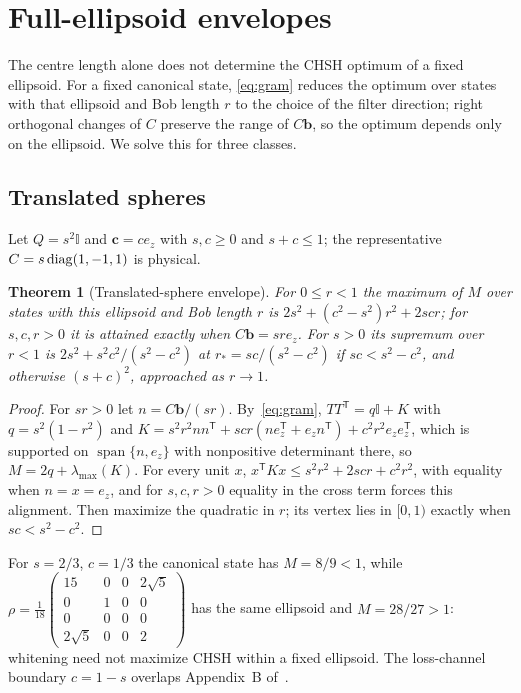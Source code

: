 \documentclass[11pt]{article}
\newtheorem{theorem}{Theorem}[section]
\theoremstyle{remark}\newtheorem{remark}[theorem]{Remark}
\newcommand{\id}{\mathbb I}\newcommand{\ket}[1]{|#1\rangle}
\newcommand{\cv}{\bm c}\newcommand{\av}{\bm a}\newcommand{\bv}{\bm b}
\begin{document}
\section{Full-ellipsoid envelopes}\label{sec:shapes}

The centre length alone does not determine the CHSH optimum of a fixed
ellipsoid. For a fixed canonical state, \eqref{eq:gram} reduces the optimum
over states with that ellipsoid and Bob length $r$ to the choice of the filter
direction; right orthogonal changes of $C$ preserve the range of $C\bv$, so the
optimum depends only on the ellipsoid. We solve this for three classes.

\subsection{Translated spheres}
Let $Q=s^2\id$ and $\cv=ce_z$ with $s,c\ge0$ and $s+c\le1$; the representative
$C=s\operatorname{diag}(1,-1,1)$ is physical.

\begin{theorem}[Translated-sphere envelope]\label{thm:sphere}
For $0\le r<1$ the maximum of $M$ over states with this ellipsoid and Bob
length $r$ is $2s^2+(c^2-s^2)r^2+2scr$; for $s,c,r>0$ it is attained exactly
when $C\bv=sre_z$. For $s>0$ its supremum over $r<1$ is
$2s^2+s^2c^2/(s^2-c^2)$ at $r_*=sc/(s^2-c^2)$ if $sc<s^2-c^2$, and otherwise
$(s+c)^2$, approached as $r\to1$.
\end{theorem}
\begin{proof}
For $sr>0$ let $n=C\bv/(sr)$. By~\eqref{eq:gram},
$TT^{\mathsf T}=q\id+K$ with $q=s^2(1-r^2)$ and
$K=s^2r^2nn^{\mathsf T}+scr(ne_z^{\mathsf T}+e_zn^{\mathsf T})+c^2r^2e_ze_z^{\mathsf T}$,
which is supported on $\operatorname{span}\{n,e_z\}$ with nonpositive
determinant there, so $M=2q+\lambda_{\max}(K)$. For every unit $x$,
$x^{\mathsf T}Kx\le s^2r^2+2scr+c^2r^2$, with equality when $n=x=e_z$, and
for $s,c,r>0$ equality in the cross term forces this alignment. Then
maximize the quadratic in $r$; its vertex lies in $[0,1)$ exactly when
$sc<s^2-c^2$.
\end{proof}
For $s=2/3$, $c=1/3$ the canonical state has $M=8/9<1$, while
$\rho=\frac1{18}\left(\begin{smallmatrix}15&0&0&2\sqrt5\\0&1&0&0\\0&0&0&0\\2\sqrt5&0&0&2\end{smallmatrix}\right)$
has the same ellipsoid and $M=28/27>1$: whitening need not maximize CHSH within
a fixed ellipsoid. The loss-channel boundary $c=1-s$ overlaps Appendix~B
of~\cite{zhang}.
\end{document}
